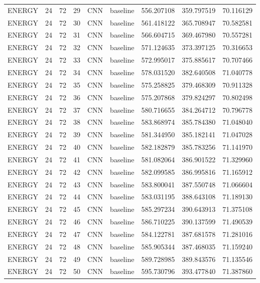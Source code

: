 \begin{table}
\begin{tabular}{lrrrllrrr}
ENERGY & 24 & 72 & 29 & CNN & baseline & 556.207108 & 359.797519 & 70.116129 \\
ENERGY & 24 & 72 & 30 & CNN & baseline & 561.418122 & 365.708947 & 70.582581 \\
ENERGY & 24 & 72 & 31 & CNN & baseline & 566.604715 & 369.467980 & 70.557281 \\
ENERGY & 24 & 72 & 32 & CNN & baseline & 571.124635 & 373.397125 & 70.316653 \\
ENERGY & 24 & 72 & 33 & CNN & baseline & 572.995017 & 375.885617 & 70.707466 \\
ENERGY & 24 & 72 & 34 & CNN & baseline & 578.031520 & 382.640508 & 71.040778 \\
ENERGY & 24 & 72 & 35 & CNN & baseline & 575.258825 & 379.468309 & 70.911328 \\
ENERGY & 24 & 72 & 36 & CNN & baseline & 575.207868 & 379.824297 & 70.802498 \\
ENERGY & 24 & 72 & 37 & CNN & baseline & 580.716655 & 384.264712 & 70.796778 \\
ENERGY & 24 & 72 & 38 & CNN & baseline & 583.868974 & 385.784380 & 71.048040 \\
ENERGY & 24 & 72 & 39 & CNN & baseline & 581.344950 & 385.182141 & 71.047028 \\
ENERGY & 24 & 72 & 40 & CNN & baseline & 582.182879 & 385.783256 & 71.141970 \\
ENERGY & 24 & 72 & 41 & CNN & baseline & 581.082064 & 386.901522 & 71.329960 \\
ENERGY & 24 & 72 & 42 & CNN & baseline & 582.099585 & 386.995816 & 71.165912 \\
ENERGY & 24 & 72 & 43 & CNN & baseline & 583.800041 & 387.550748 & 71.066604 \\
ENERGY & 24 & 72 & 44 & CNN & baseline & 583.031195 & 388.643108 & 71.189130 \\
ENERGY & 24 & 72 & 45 & CNN & baseline & 585.297234 & 390.643913 & 71.375108 \\
ENERGY & 24 & 72 & 46 & CNN & baseline & 586.710225 & 390.137599 & 71.490539 \\
ENERGY & 24 & 72 & 47 & CNN & baseline & 584.122781 & 387.681578 & 71.281016 \\
ENERGY & 24 & 72 & 48 & CNN & baseline & 585.905344 & 387.468035 & 71.159240 \\
ENERGY & 24 & 72 & 49 & CNN & baseline & 589.728985 & 389.843576 & 71.135546 \\
ENERGY & 24 & 72 & 50 & CNN & baseline & 595.730796 & 393.477840 & 71.387860 \\

\end{tabular}
\end{table}
